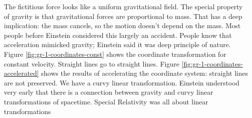 \documentclass[]{article}
\begin{document}
The fictitious force looks like a uniform gravitational field. The special property of gravity is that gravitational forces are proportional to mass. That has a deep implication: the mass cancels, so the motion doesn't depend on the mass. Most people before Einstein considered this largely an accident. People know that acceleration mimicked gravity; Einstein said it was deep principle of nature. Figure \ref{fig:gr-1-coordinates-const} shows the coordinate transformation for constant velocity. Straight lines go to straight lines. Figure \ref{fig:gr-1-coordinates-accelerated} shows the results of accelerating the coordinate system: straight lines are not preserved. We have a curvy linear transformation. Einstein understood very early that there is a connection between gravity and curvy linear transformations of spacetime. Special Relativity was all about linear transformations
\end{document}
